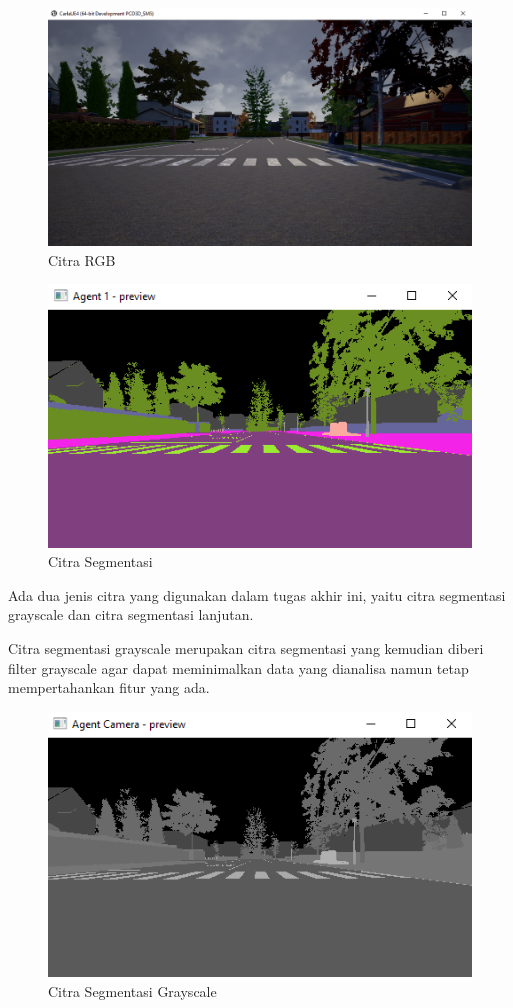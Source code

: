 \begin{figure}[H] 
	\centering
	\includegraphics[width=.7\linewidth]{images/rgb}
	\caption{Citra RGB}
	\label{fig:citra_rgb}
\end{figure}
\begin{figure}[H] 
	\centering
	\includegraphics[width=.7\linewidth]{images/segmentasi}
	\caption{Citra Segmentasi}
	\label{fig:segmentasi}
\end{figure}
Ada dua jenis citra yang digunakan dalam tugas akhir ini, yaitu citra segmentasi grayscale dan citra segmentasi lanjutan.

Citra segmentasi grayscale merupakan citra segmentasi yang kemudian diberi filter grayscale agar dapat meminimalkan data yang dianalisa namun tetap mempertahankan fitur yang ada.

\begin{figure}[H] 
	\centering
	\includegraphics[width=.7\linewidth]{images/grayscale}
	\caption{Citra Segmentasi Grayscale}
	\label{fig:grayscale}
\end{figure}

